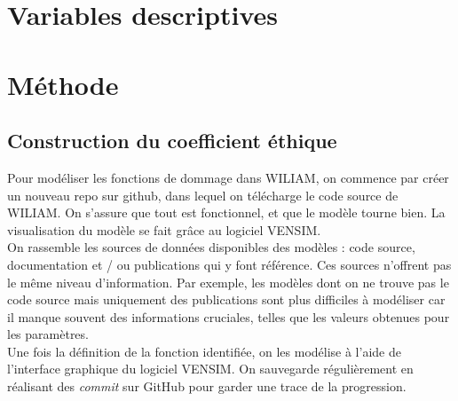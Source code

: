 
\section{Variables descriptives}

\section{Méthode}

\subsection{Construction du coefficient éthique}

\begin{methodbox}

Pour modéliser les fonctions de dommage dans WILIAM, on commence par créer un nouveau repo sur github, dans lequel on télécharge le code source de WILIAM. On s'assure que tout est fonctionnel, et que le modèle tourne bien. La visualisation du modèle se fait grâce au logiciel VENSIM. \\

On rassemble les sources de données disponibles des modèles : code source, documentation et / ou publications qui y font référence. Ces sources n'offrent pas le même niveau d'information. Par exemple, les modèles dont on ne trouve pas le code source mais uniquement des publications sont plus difficiles à modéliser car il manque souvent des informations cruciales, telles que les valeurs obtenues pour les paramètres. \\

Une fois la définition de la fonction identifiée, on les modélise à l'aide de l'interface graphique du logiciel VENSIM. On sauvegarde régulièrement en réalisant des \textit{commit} sur GitHub pour garder une trace de la progression.
    
\end{methodbox}

